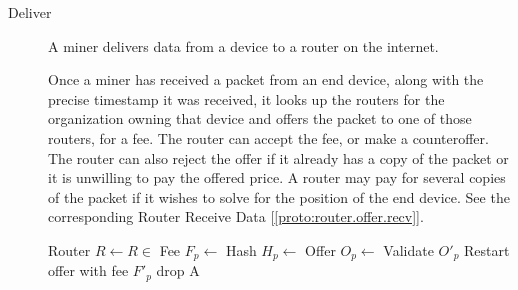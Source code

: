 \documentclass[10pt, nonatbib, nocopyrightspace, reprint]{sigplanconf}
\newenvironment{protocol}[2]{
  \begin{algorithm}[!htb]
    \DontPrintSemicolon
    \caption{#1}\label{#2}
}{
  \end{algorithm}
  \FloatBarrier
}
\newcommand{\protoref}[1]{[\autoref{#1}]}
\begin{document}
\begin{description}
    \begin{protocol}{Miner Receive Serialization Challenge}{proto:miner.recv.challenge.serialization}

    \end{protocol}


  \item [Deliver] A miner delivers data from a device to a router on the internet.

    Once a miner has received a packet from an end device, along with the precise timestamp it was received, it looks up the routers for the organization owning that device and offers the packet to one of those routers, for a fee. The router can accept the fee, or make a counteroffer. The router can also reject the offer if it already has a copy of the packet or it is unwilling to pay the offered price. A router may pay for several copies of the packet if it wishes to solve for the position of the end device. See the corresponding Router Receive Data \protoref{proto:router.offer.recv}.

    \begin{protocol}{Miner Deliver Device Data}{proto:miner.data.deliver}

       {
        Router $R \leftarrow R \in $  \;
        Fee $F_p \leftarrow $  \;
        Hash $H_p \leftarrow $  \;
        Offer $O_p \leftarrow $  \;
         {
           {
            Validate ${O\prime}_p$\;
             {
               {
                Restart offer with fee ${F\prime}_p$\;
              }
               {
                drop A
              }
            }
          }
        }
      }
    \end{protocol}




\end{description}
\end{document}
